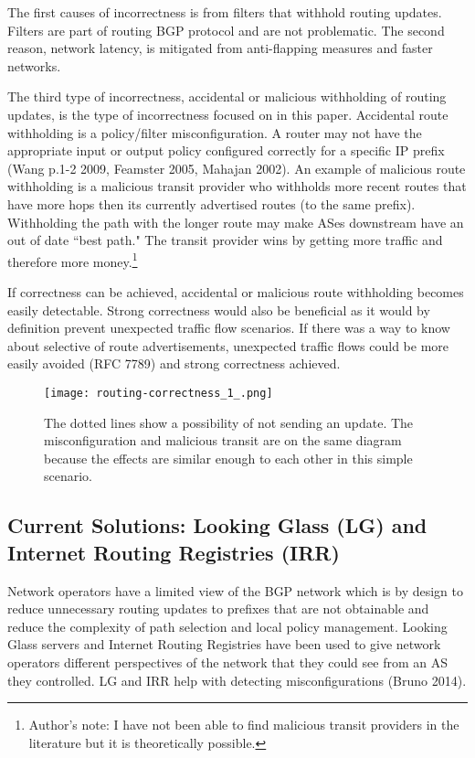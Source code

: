 \documentclass[letterpaper, 10 pt, conference]{ieeeconf}  %
\begin{document}
The first causes of incorrectness is from filters that withhold routing updates. Filters are part of routing BGP protocol and are not problematic. The second reason, network latency, is mitigated from anti-flapping measures and faster networks. 

The third type of incorrectness, accidental or malicious withholding of routing updates, is the type of incorrectness focused on in this paper. Accidental route withholding is a policy/filter misconfiguration. A router may not have the appropriate input or output policy configured correctly for a specific IP prefix (Wang p.1-2 2009, Feamster 2005, Mahajan 2002). An example of malicious route withholding is a malicious transit provider who withholds more recent routes that have more hops then its currently advertised routes (to the same prefix). Withholding the path with the longer route may make ASes downstream have an out of date ``best path." The transit provider wins by getting more traffic and therefore more money.\footnote{Author's note: I have not been able to find malicious transit providers in the literature but it is theoretically possible.}

If correctness can be achieved, accidental or malicious route withholding becomes easily detectable.
Strong correctness would also be beneficial as it would by definition prevent unexpected traffic flow scenarios. If there was a way to know about selective of route advertisements, unexpected traffic flows could be more easily avoided (RFC 7789) and strong correctness achieved. 


\begin{figure}[!ht]
	\centering
	\texttt{[image: routing-correctness\_1\_.png]}
    \caption{The dotted lines show a possibility of not sending an update. The misconfiguration and malicious transit are on the same diagram because the effects are similar enough to each other in this simple scenario.  
}

\end{figure}

\subsection{Current Solutions: Looking Glass (LG) and Internet Routing Registries (IRR)}

Network operators have a limited view of the BGP network which is by design to reduce unnecessary routing updates to prefixes that are not obtainable and reduce the complexity of path selection and local policy management. Looking Glass servers and Internet Routing Registries have been used to give network operators different perspectives of the network that they could see from an AS they controlled. LG and IRR help with detecting misconfigurations (Bruno 2014).
\end{document}
